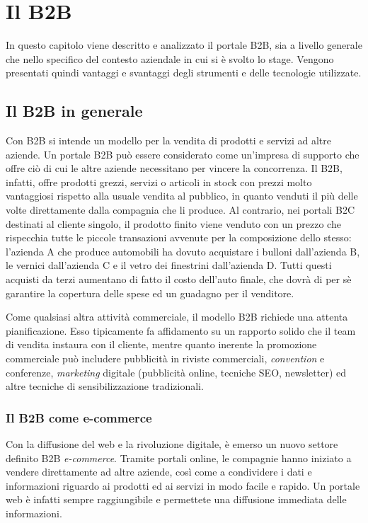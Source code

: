 \chapter{Il B2B}
\begin{flushright}
	\parbox{13cm}{\small In questo capitolo viene descritto e analizzato il portale B2B, sia a livello generale che nello specifico del contesto aziendale in cui si è svolto lo stage. Vengono presentati quindi vantaggi e svantaggi degli strumenti e delle tecnologie utilizzate.}
\end{flushright}
\section{Il B2B in generale}
Con B2B si intende un modello per la vendita di prodotti e servizi ad altre aziende. Un portale B2B può essere considerato come un'impresa di supporto che offre ciò di cui le altre aziende necessitano per vincere la concorrenza. Il B2B, infatti, offre prodotti grezzi, servizi o articoli in stock con prezzi molto vantaggiosi rispetto alla usuale vendita al pubblico, in quanto venduti il più delle volte direttamente dalla compagnia che li produce. Al contrario, nei portali B2C destinati al cliente singolo, il prodotto finito viene venduto con un prezzo che rispecchia tutte le piccole transazioni avvenute per la composizione dello stesso: l'azienda A che produce automobili ha dovuto acquistare i bulloni dall'azienda B, le vernici dall'azienda C e il vetro dei finestrini dall'azienda D. Tutti questi acquisti da terzi aumentano di fatto il costo dell'auto finale, che dovrà di per sè garantire la copertura delle spese ed un guadagno per il venditore.

Come qualsiasi altra attività commerciale, il modello B2B richiede una attenta pianificazione. Esso tipicamente fa affidamento su un rapporto solido che il team di vendita instaura con il cliente, mentre quanto inerente la promozione commerciale può includere pubblicità in riviste commerciali, \textit{convention} e conferenze, \textit{marketing} digitale (pubblicità online, tecniche SEO, newsletter) ed altre tecniche di sensibilizzazione tradizionali.

\subsection{Il B2B come e-commerce}
Con la diffusione del web e la rivoluzione digitale, è emerso un nuovo settore definito B2B \textit{e-commerce}. Tramite portali online, le compagnie hanno iniziato a vendere direttamente ad altre aziende, così come a condividere i dati e informazioni riguardo ai prodotti ed ai servizi in modo facile e rapido. Un portale web è infatti sempre raggiungibile e permettete una diffusione immediata
delle informazioni.

